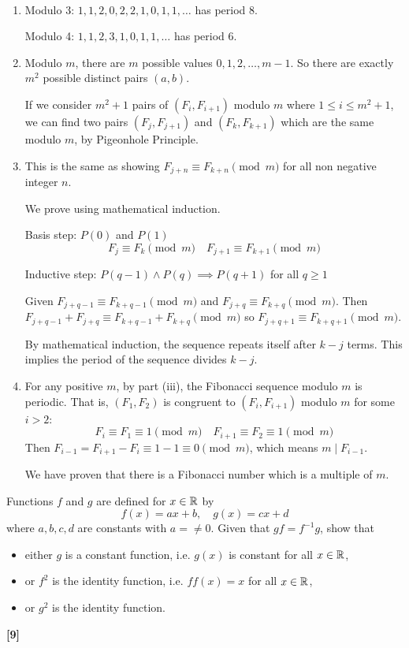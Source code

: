 \begin{solution} \
\begin{enumerate}[label=(\roman*)]
\item Modulo 3: $1, 1, 2, 0, 2, 2, 1, 0, 1, 1, \dots$ has period $8$.

Modulo 4: $1, 1, 2, 3, 1, 0, 1, 1, \dots$ has period $6$.

\item Modulo $m$, there are $m$ possible values $0,1,2,\dots,m-1$. So there are exactly $m^2$ possible distinct pairs $(a,b)$.

If we consider $m^2+1$ pairs of $(F_i,F_{i+1})$ modulo $m$ where $1\le i\le m^2+1$, we can find two pairs $(F_j,F_{j+1})$ and $(F_k,F_{k+1})$ which are the same modulo $m$, by Pigeonhole Principle.

\item This is the same as showing $F_{j+n} \equiv F_{k+n} \pmod m$ for all non negative integer $n$.

We prove using mathematical induction.

Basis step: $P(0)$ and $P(1)$
\[ F_j \equiv F_k \pmod m \quad F_{j+1} \equiv F_{k+1} \pmod m \]

Inductive step: $P(q-1)\land P(q)\implies P(q+1)$ for all $q\ge 1$

Given $F_{j+q-1} \equiv F_{k+q-1} \pmod m$ and $F_{j+q} \equiv F_{k+q} \pmod m$. Then $F_{j+q-1}+F_{j+q} \equiv F_{k+q-1}+F_{k+q}\pmod m$ so $F_{j+q+1}\equiv F_{k+q+1}\pmod m$.

By mathematical induction, the sequence repeats itself after $k-j$ terms. This implies the period of the sequence divides $k-j$.

\item For any positive $m$, by part (iii), the Fibonacci sequence modulo $m$ is periodic. That is, $(F_1,F_2)$ is congruent to $(F_i,F_{i+1})$ modulo $m$ for some $i>2$:
\[ F_i \equiv F_1 \equiv 1 \pmod m \quad F_{i+1} \equiv F_2 \equiv 1 \pmod m \]
Then $F_{i-1}=F_{i+1}-F_i\equiv1-1\equiv0\pmod m$, which means $m\mid F_{i-1}$.

We have proven that there is a Fibonacci number which is a multiple of $m$.
\end{enumerate}
\end{solution}
\pagebreak

\begin{prbm}
Functions $f$ and $g$ are defined for $x\in\mathbb R$ by
\[ f(x)=ax+b, \quad g(x)=cx+d \]
where $a,b,c,d$ are constants with $a=\neq0$. Given that $gf=f^{-1}g$, show that
\begin{itemize}
\item either $g$ is a constant function, i.e. $g(x)$ is constant for all $x\in\mathbb R$,
\item or $f^2$ is the identity function, i.e. $ff(x)=x$ for all $x\in\mathbb R$,
\item or $g^2$ is the identity function.
\end{itemize}
\hfill \textbf{[9]}
\end{prbm}

